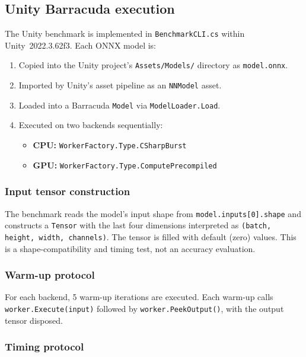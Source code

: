 \documentclass[10pt,twocolumn]{article}
\begin{document}
\subsection{Unity Barracuda execution}

The Unity benchmark is implemented in \texttt{BenchmarkCLI.cs} within Unity~2022.3.62f3. Each ONNX model is:
\begin{enumerate}[nosep,leftmargin=*]
  \item Copied into the Unity project's \texttt{Assets/Models/} directory as \texttt{model.onnx}.
  \item Imported by Unity's asset pipeline as an \texttt{NNModel} asset.
  \item Loaded into a Barracuda \texttt{Model} via \texttt{ModelLoader.Load}.
  \item Executed on two backends sequentially:
    \begin{itemize}[nosep]
      \item \textbf{CPU:} \texttt{WorkerFactory.Type.CSharpBurst}
      \item \textbf{GPU:} \texttt{WorkerFactory.Type.}\allowbreak\texttt{ComputePrecompiled}
    \end{itemize}
\end{enumerate}

\subsubsection{Input tensor construction}

The benchmark reads the model's input shape from \texttt{model.inputs[0].shape} and constructs a \texttt{Tensor} with the last four dimensions interpreted as \texttt{(batch, height, width, channels)}. The tensor is filled with default (zero) values. This is a shape-compatibility and timing test, not an accuracy evaluation.

\subsubsection{Warm-up protocol}

For each backend, 5 warm-up iterations are executed. Each warm-up calls \texttt{worker.Execute(input)} followed by \texttt{worker.PeekOutput()}, with the output tensor disposed.

\subsubsection{Timing protocol}\label{sec:timing}
\end{document}
